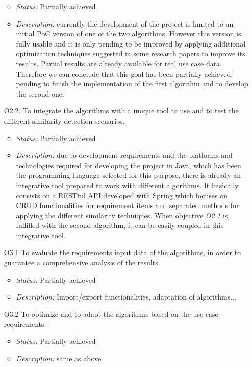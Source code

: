 \documentclass[11pt]{article}
\begin{document}
\begin{enumerate}
\begin{itemize}
\item \textit{Status:} Partially achieved
\item \textit{Description:} currently the development of the project is limited to an initial PoC version of one of the two algorithms. However this version is fully usable and it is only pending to be improved by applying additional optimization techniques suggested in some research papers to improve its results. Partial results are already available for real use case data. Therefore we can conclude that this goal has been partially achieved, pending to finish the implementation of the first algorithm and to develop the second one.
\end{itemize}
\item[O2.2.] To integrate the algorithms with a unique tool to use and to test the different similarity detection scenarios.
\begin{itemize}
\item \textit{Status:} Partially achieved
\item \textit{Description:} due to development requirements and the platforms and technologies required for developing the project in Java, which has been the programming language selected for this purpose, there is already an integrative tool prepared to work with different algorithms. It basically consists on a RESTful API developed with Spring which focuses on CRUD functionalities for requirement items and separated methods for applying the different similarity techniques. When objective \textit{O2.1} is fulfilled with the second algorithm, it can be easily coupled in this integrative tool.
\end{itemize}
\item[O3.1] To evaluate the requirements input data of the algorithms, in order to guarantee a comprehensive analysis of the results.
\begin{itemize}
\item \textit{Status:} Partially achieved
\item \textit{Description:} Import/export functionalities, adaptation of algorithms...
\end{itemize}
\item[O3.2] To optimize and to adapt the algorithms based on the use case requirements.
\begin{itemize}
\item \textit{Status:} Partially achieved
\item \textit{Description:} same as above

\end{itemize}
\end{enumerate}
\end{document}
